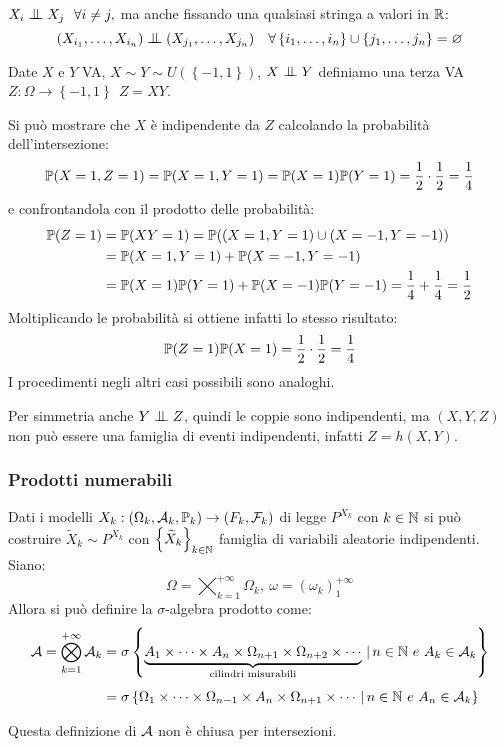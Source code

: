 \smallskip
\begin{oss}
  $X_i \indep X_j \ \ \forall i \ne j,$ ma anche fissando una qualsiasi stringa a valori in $\mathbb R$: 
  $$(X_{i_1}, \dots, X_{i_n}) \indep (X_{j_1}, \dots, X_{j_n}) \quad \forall \left \{ i_1, \dots, i_n \right \} \cup \left \{ j_1, \dots, j_n \right \}= \varnothing$$
\end{oss}

\smallskip
\begin{cese}
  Date $X$ e $Y$ VA, $X \sim Y \sim U( \left \{ -1, 1 \right \})$, $X \indep Y$ definiamo una terza VA $Z: \Omega \to \left \{ -1, 1 \right \} \ \ Z=XY$.

  Si può mostrare che $X$ è indipendente da $Z$ calcolando la probabilità dell'intersezione:
  $$\mathbb P(X=1, Z=1)= \mathbb P(X=1, Y=1)= \mathbb P(X=1) \mathbb P(Y=1)= \frac{1}{2} \cdot \frac{1}{2}= \frac{1}{4}$$
  e confrontandola con il prodotto delle probabilità:
  \begin{align*}
    \mathbb P(Z=1) &=\mathbb P(XY=1)=\mathbb P((X=1, Y=1) \cup (X=-1, Y=-1)) \\
    & =\mathbb P(X=1, Y=1)+\mathbb P(X=-1, Y=-1) \\
    & = \mathbb P(X=1) \mathbb P(Y=1)+ \mathbb P(X=-1) \mathbb P(Y=-1) = \frac{1}{4}+ \frac{1}{4}= \frac{1}{2}
  \end{align*}
  Moltiplicando le probabilità si ottiene infatti lo stesso risultato:
  $$\mathbb P(Z=1)\mathbb P(X=1) = \frac{1}{2} \cdot \frac{1}{2}= \frac{1}{4}$$
  I procedimenti negli altri casi possibili sono analoghi.

  Per simmetria anche $Y \indep Z$, quindi le coppie sono indipendenti, ma $(X,Y,Z)$ non può essere una famiglia di eventi indipendenti, infatti $Z=h(X,Y)$.
\end{cese}

\subsubsection{Prodotti numerabili}
Dati i modelli $X_k:(\Omega_k, \mathcal A_k, \mathbb P_k) \to (F_k, \mathcal F_k)$ di legge $P^{X_k}$ con $ k \in \mathbb N$ si può costruire $\widetilde{X}_k \sim P^{X_k}$ con $\left \{ \widetilde{X}_k \right \}_{k \in \mathbb N}$ famiglia di variabili aleatorie indipendenti.
Siano:
$$\Omega = \bigtimes_{k=1}^{+\infty} \Omega_k, \ \omega= \left (\omega_k \right )_1^{+\infty}$$
Allora si può definire la $\sigma$-algebra prodotto come:
\begin{align*}
  \mathcal A = \bigotimes\limits_{k=1}^{+\infty} \mathcal A_k
  &=\sigma \left \{ \underbrace{A_1 \times \cdots \times A_n \times \Omega_{n+1} \times \Omega_{n+2} \times \cdots}_{\text{cilindri misurabili}} \, | \, n \in \mathbb N \ e \ A_k \in \mathcal A_k \right \}\\[4pt]
  &= \sigma \left \{\Omega_1 \times \cdots \times \Omega_{n-1} \times A_n \times \Omega_{n+1} \times \cdots \, | \, n \in \mathbb N \ e \ A_n \in \mathcal A_k \right \}
\end{align*}
\begin{nb}
  Questa definizione di $\mathcal A$ non è chiusa per intersezioni.
\end{nb}

